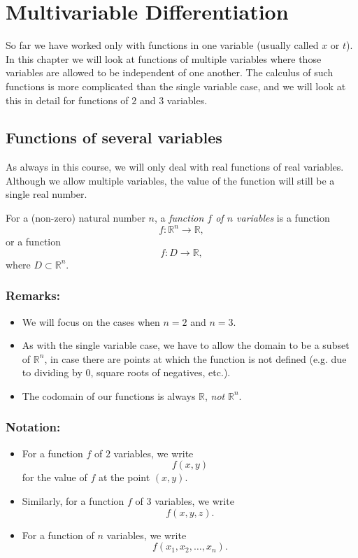 \section{Multivariable Differentiation}

So far we have worked only with functions in one variable (usually called $x$ or $t$).  In this chapter we will look at functions of multiple variables where those variables are allowed to be independent of one another.  The calculus of such functions is more complicated than the single variable case, and we will look at this in detail for functions of $2$ and $3$ variables.

\subsection{Functions of several variables}

  As always in this course, we will only deal with real functions of real variables.  Although we allow multiple variables, the value of the function will still be a single real number.

  \begin{definition}
    For a (non-zero) natural number $n$, a \emph{function $f$ of $n$ variables} is a function
      \[
        f \colon \mathbb{R}^n \longrightarrow \mathbb{R},
      \]
    or a function
      \[
        f \colon D \longrightarrow \mathbb{R},
      \]
    where $D \subset \mathbb{R}^n$.
  \end{definition}

  \subsubsection*{Remarks:}
    \begin{itemize}[topsep=0pt]
      \item We will focus on the cases when $n = 2$ and $n = 3$.
      \item As with the single variable case, we have to allow the domain to be a subset of $\mathbb{R}^n$, in case there are points at which the function is not defined (e.g. due to dividing by $0$, square roots of negatives, etc.).
      \item The codomain of our functions is always $\mathbb{R}$, \emph{not} $\mathbb{R}^n$.
    \end{itemize}

  \subsubsection*{Notation:}
    \begin{itemize}[topsep=0pt]
      \item For a function $f$ of $2$ variables, we write
        \[
          f(x, y)
        \]
      for the value of $f$ at the point $(x, y)$.
      \item Similarly, for a function $f$ of $3$ variables, we write
        \[
          f(x, y, z).
        \]
      \item For a function of $n$ variables, we write
        \[
          f(x_1, x_2, \dotsc, x_n).
        \]
    \end{itemize}


